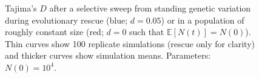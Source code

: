 \documentclass[]{article}
\begin{document}
\begin{figure}[htb]
\caption{
Tajima's $D$ after a selective sweep from standing genetic variation during evolutionary rescue (blue; $d=0.05$) or in a population of roughly constant size (red; $d=0$ such that $\mathbb{E}[N(t)]=N(0)$).
Thin curves show 100 replicate simulations (rescue only for clarity) and thicker curves show simulation means.
Parameters: $N(0)=10^4$.
}%
\label{fig:rescueSGV_tajimasD}
\end{figure}
\end{document}

